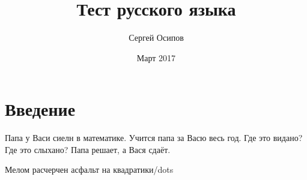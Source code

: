 \documentclass{article}
\title{Тест русского языка}
\author{Сергей Осипов}
\date{Март 2017}
\begin{document}
\maketitle

\section{Введение}

Папа у Васи сиелн в математике. Учится папа за Васю весь год. Где это видано? Где это слыхано? Папа решает, а Вася сдаёт.

Мелом расчерчен асфальт на квадратики/dots
\end{document}
